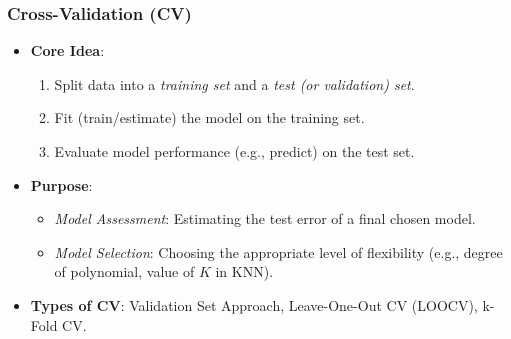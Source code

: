 \documentclass[12pt,a4paper]{article}
\begin{document}
\begin{itemize}
    \subsubsection{Cross-Validation (CV) }
        \begin{itemize}
            \item \textbf{Core Idea}:
                \begin{enumerate}
                    \item Split data into a \textit{training set} and a \textit{test (or validation) set}.
                    \item Fit (train/estimate) the model on the training set.
                    \item Evaluate model performance (e.g., predict) on the test set.
                \end{enumerate}
            \item \textbf{Purpose}:
                \begin{itemize}
                    \item \textit{Model Assessment}: Estimating the test error of a final chosen model.
                    \item \textit{Model Selection}: Choosing the appropriate level of flexibility (e.g., degree of polynomial, value of $K$ in KNN).
                \end{itemize}
            \item \textbf{Types of CV}: Validation Set Approach, Leave-One-Out CV (LOOCV), k-Fold CV.
        \end{itemize}


\end{itemize}
\end{document}
